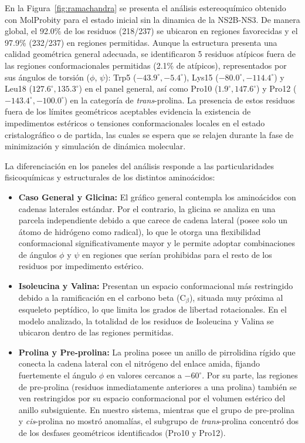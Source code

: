 En la Figura~\ref{fig:ramachandra} se presenta el análisis estereoquímico obtenido con MolProbity para el estado inicial sin la dinamica de la NS2B-NS3. De manera global, el 92.0\% de los residuos (218/237) se ubicaron en regiones favorecidas y el 97.9\% (232/237) en regiones permitidas. Aunque la estructura presenta una calidad geométrica general adecuada, se identificaron 5 residuos atípicos fuera de las regiones conformacionales permitidas (2.1\% de atípicos), representados por sus ángulos de torsión ($\phi$, $\psi$): Trp5 ($-43.9^\circ, -5.4^\circ$), Lys15 ($-80.0^\circ, -114.4^\circ$) y Leu18 ($127.6^\circ, 135.3^\circ$) en el panel general, así como Pro10 ($1.9^\circ, 147.6^\circ$) y Pro12 ($-143.4^\circ, -100.0^\circ$) en la categoría de \textit{trans}-prolina. La presencia de estos residuos fuera de los límites geométricos aceptables evidencia la existencia de impedimentos estéricos o tensiones conformacionales locales en el estado cristalográfico o de partida, las cuales se espera que se relajen durante la fase de minimización y simulación de dinámica molecular.

La diferenciación en los paneles del análisis responde a las particularidades fisicoquímicas y estructurales de los distintos aminoácidos:

\begin{itemize}
    \item \textbf{Caso General y Glicina:} El gráfico general contempla los aminoácidos con cadenas laterales estándar. Por el contrario, la glicina se analiza en una parcela independiente debido a que carece de cadena lateral (posee solo un átomo de hidrógeno como radical), lo que le otorga una flexibilidad conformacional significativamente mayor y le permite adoptar combinaciones de ángulos $\phi$ y $\psi$ en regiones que serían prohibidas para el resto de los residuos por impedimento estérico.
    \item \textbf{Isoleucina y Valina:} Presentan un espacio conformacional más restringido debido a la ramificación en el carbono beta ($\text{C}_\beta$), situada muy próxima al esqueleto peptídico, lo que limita los grados de libertad rotacionales. En el modelo analizado, la totalidad de los residuos de Isoleucina y Valina se ubicaron dentro de las regiones permitidas.
    \item \textbf{Prolina y Pre-prolina:} La prolina posee un anillo de pirrolidina rígido que conecta la cadena lateral con el nitrógeno del enlace amida, fijando fuertemente el ángulo $\phi$ en valores cercanos a $-60^\circ$. Por su parte, las regiones de pre-prolina (residuos inmediatamente anteriores a una prolina) también se ven restringidos por su espacio conformacional por el volumen estérico del anillo subsiguiente. En nuestro sistema, mientras que el grupo de pre-prolina y \textit{cis}-prolina no mostró anomalías, el subgrupo de \textit{trans}-prolina concentró dos de los desfases geométricos identificados (Pro10 y Pro12).
\end{itemize}



